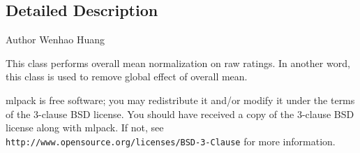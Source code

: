 \subsection{Detailed Description}
\begin{DoxyAuthor}{Author}
Wenhao Huang
\end{DoxyAuthor}
This class performs overall mean normalization on raw ratings. In another word, this class is used to remove global effect of overall mean.

mlpack is free software; you may redistribute it and/or modify it under the terms of the 3-\/clause B\+SD license. You should have received a copy of the 3-\/clause B\+SD license along with mlpack. If not, see {\tt http\+://www.\+opensource.\+org/licenses/\+B\+S\+D-\/3-\/\+Clause} for more information. 